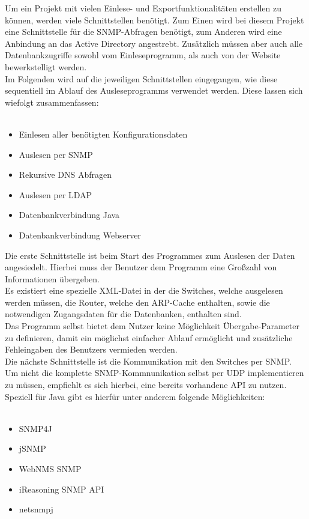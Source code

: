 Um ein Projekt mit vielen Einlese- und Exportfunktionalitäten erstellen zu können, werden viele Schnittstellen benötigt.
Zum Einen wird bei diesem Projekt eine Schnittstelle für die SNMP-Abfragen benötigt, zum Anderen wird eine Anbindung an das Active Directory angestrebt. Zusätzlich müssen aber auch alle Datenbankzugriffe sowohl vom Einleseprogramm, als auch von der Website bewerkstelligt werden.\\
Im Folgenden wird auf die jeweiligen Schnittstellen eingegangen, wie diese sequentiell im Ablauf des Ausleseprogramms verwendet werden. Diese lassen sich wiefolgt zusammenfassen:\\
\\
\begin{itemize}
\item Einlesen aller benötigten Konfigurationsdaten
\item Auslesen per SNMP
\item Rekursive DNS Abfragen
\item Auslesen per LDAP
\item Datenbankverbindung Java
\item Datenbankverbindung Webserver
\end{itemize}

Die erste Schnittstelle ist beim Start des Programmes zum Auslesen der Daten angesiedelt. Hierbei muss der Benutzer dem Programm eine Großzahl von Informationen übergeben.\\
Es existiert eine spezielle XML-Datei in der die Switches, welche ausgelesen werden müssen, die Router, welche den ARP-Cache enthalten, sowie die notwendigen Zugangsdaten für die Datenbanken, enthalten sind. \\
Das Programm selbst bietet dem Nutzer keine Möglichkeit Übergabe-Parameter zu definieren, damit ein möglichst einfacher Ablauf ermöglicht und zusätzliche Fehleingaben des Benutzers vermieden werden.\\
Die nächste Schnittstelle ist die Kommunikation mit den Switches per SNMP. Um nicht die komplette SNMP-Kommnunikation selbst per UDP implementieren zu müssen, empfiehlt es sich hierbei, eine bereits vorhandene API zu nutzen.\\
Speziell für Java gibt es hierfür unter anderem folgende Möglichkeiten:\\
\\
\begin{itemize}
\item SNMP4J
\item jSNMP
\item WebNMS SNMP
\item iReasoning SNMP API
\item netsnmpj
\end{itemize}

